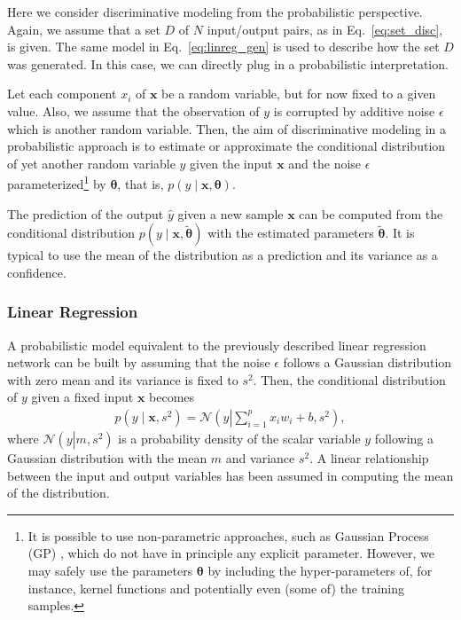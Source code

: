 \documentclass{now}
\newcommand{\vect}[1]{\mathbf{#1}}
\newcommand{\vects}[1]{\boldsymbol{#1}}
\newcommand{\vx}[0]{\vect{x}}
\newcommand{\TT}[0]{{\vects{\theta}}}
\newcommand{\NN}[0]{\mathcal{N}}
\begin{document}
Here we consider discriminative modeling from
the probabilistic perspective. Again, we assume that a set
$D$ of $N$ input/output pairs, as in
Eq.~\eqref{eq:set_disc}, is given. The same model in
Eq.~\eqref{eq:linreg_gen} is used to describe how the set
$D$ was generated. In this case, we can directly plug in a
probabilistic interpretation.

Let each component $x_i$ of $\vx$ be a random variable, but
for now fixed to a given value. Also, we assume that the
observation of $y$ is corrupted by additive noise
$\epsilon$ which is another random variable.
Then, the aim of
discriminative modeling in a probabilistic approach is to
estimate or approximate the conditional distribution of
yet another random variable $y$ given the input $\vx$ and
the noise $\epsilon$ parameterized\footnote{It is
possible to use non-parametric approaches, such as Gaussian
Process (GP) \citep[see, e.g.,][]{Rasmussen2006}, which do
not have in principle any explicit parameter. However, we may safely
use the parameters $\TT$ by including the hyper-parameters
of, for instance, kernel functions and potentially even
(some of) the training samples.} by $\TT$, that is, ${p(y \mid \vx,
\TT)}$.

The prediction of the output $\hat{y}$ given a new sample $\vx$
can be computed from the conditional distribution $p(y \mid \vx,
        \tilde{\TT})$ with the estimated parameters
$\tilde{\TT}$. It is typical to use the mean of the distribution
as a prediction and its variance as a confidence.

\subsubsection{Linear Regression}

A probabilistic model equivalent to the previously described
linear regression network can be 
built by assuming
that the noise
$\epsilon$ follows a Gaussian distribution with zero mean
and its variance is fixed to $s^2$. Then, the conditional
distribution of $y$ given a fixed input $\vx$ becomes
\begin{align*}
    p(y \mid \vx, s^2) = \NN \left( y \left| \sum_{i=1}^p
    x_i w_i + b, s^2\right.\right),
\end{align*}
where $\NN \left( y \left| m, s^2\right.\right)$ is a
probability density of the scalar variable $y$ following a Gaussian distribution
with the mean $m$ and variance $s^2$. A linear relationship
between the input and output variables has been assumed in
computing the mean of the distribution.
\end{document}
